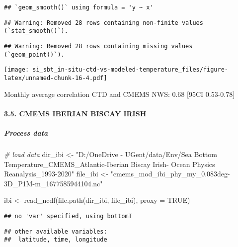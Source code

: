 \documentclass[
]{article}
\newenvironment{Shaded}{\begin{snugshade}}{\end{snugshade}}
\newcommand{\AttributeTok}[1]{\textcolor[rgb]{0.77,0.63,0.00}{#1}}
\newcommand{\CommentTok}[1]{\textcolor[rgb]{0.56,0.35,0.01}{\textit{#1}}}
\newcommand{\ConstantTok}[1]{\textcolor[rgb]{0.00,0.00,0.00}{#1}}
\newcommand{\FunctionTok}[1]{\textcolor[rgb]{0.00,0.00,0.00}{#1}}
\newcommand{\NormalTok}[1]{#1}
\newcommand{\OtherTok}[1]{\textcolor[rgb]{0.56,0.35,0.01}{#1}}
\newcommand{\StringTok}[1]{\textcolor[rgb]{0.31,0.60,0.02}{#1}}
\begin{document}
\begin{verbatim}
## `geom_smooth()` using formula = 'y ~ x'
\end{verbatim}

\begin{verbatim}
## Warning: Removed 28 rows containing non-finite values (`stat_smooth()`).
\end{verbatim}

\begin{verbatim}
## Warning: Removed 28 rows containing missing values (`geom_point()`).
\end{verbatim}

\texttt{[image: si\_sbt\_in-situ-ctd-vs-modeled-temperature\_files/figure-latex/unnamed-chunk-16-4.pdf]}

Monthly average correlation CTD and CMEMS NWS: 0.68 {[}95CI 0.53-0.78{]}

\hypertarget{cmems-iberian-biscay-irish}{%
\paragraph{3.5. CMEMS IBERIAN BISCAY
IRISH}\label{cmems-iberian-biscay-irish}}

\hypertarget{process-data-3}{%
\subparagraph{Process data}\label{process-data-3}}

\begin{Shaded}
\begin{Highlighting}[]
\CommentTok{\# load data}
\NormalTok{dir\_ibi }\OtherTok{\textless{}{-}} \StringTok{"D:/OneDrive {-} UGent/data/Env/Sea Bottom Temperature\_CMEMS\_Atlantic{-}Iberian Biscay Irish{-} Ocean Physics Reanalysis\_1993{-}2020"}
\NormalTok{file\_ibi }\OtherTok{\textless{}{-}} \StringTok{"cmems\_mod\_ibi\_phy\_my\_0.083deg{-}3D\_P1M{-}m\_1677585944104.nc"}

\NormalTok{ibi }\OtherTok{\textless{}{-}} \FunctionTok{read\_ncdf}\NormalTok{(}\FunctionTok{file.path}\NormalTok{(dir\_ibi, file\_ibi), }\AttributeTok{proxy =} \ConstantTok{TRUE}\NormalTok{)}
\end{Highlighting}
\end{Shaded}

\begin{verbatim}
## no 'var' specified, using bottomT
\end{verbatim}

\begin{verbatim}
## other available variables:
##  latitude, time, longitude
\end{verbatim}
\end{document}
